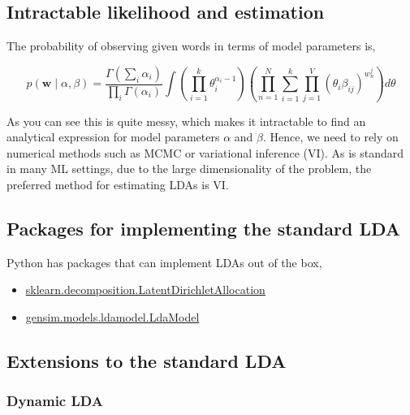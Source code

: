 \documentclass[
]{book}
\providecommand{\tightlist}{%
  \setlength{\itemsep}{0pt}\setlength{\parskip}{0pt}}
\begin{document}
\hypertarget{intractable-likelihood-and-estimation}{%
\subsection{Intractable likelihood and estimation}\label{intractable-likelihood-and-estimation}}

The probability of observing given words in terms of model parameters is,

\[p(\mathbf{w} \mid \alpha, \beta)=\frac{\Gamma\left(\sum_{i} \alpha_{i}\right)}{\prod_{i} \Gamma\left(\alpha_{i}\right)} \int\left(\prod_{i=1}^{k} \theta_{i}^{\alpha_{i}-1}\right)\left(\prod_{n=1}^{N} \sum_{i=1}^{k} \prod_{j=1}^{V}\left(\theta_{i} \beta_{i j}\right)^{w_{n}^{j}}\right) d \theta\]

As you can see this is quite messy, which makes it intractable to find an analytical expression for model parameters \(\alpha\) and \(\beta\). Hence, we need to rely on numerical methods such as MCMC or variational inference (VI). As is standard in many ML settings, due to the large dimensionality of the problem, the preferred method for estimating LDAs is VI.

\hypertarget{packages-for-implementing-the-standard-lda}{%
\subsection{Packages for implementing the standard LDA}\label{packages-for-implementing-the-standard-lda}}

Python has packages that can implement LDAs out of the box,

\begin{itemize}
\tightlist
\item
  \href{https://scikit-learn.org/stable/modules/generated/sklearn.decomposition.LatentDirichletAllocation.html}{sklearn.decomposition.LatentDirichletAllocation}
\item
  \href{https://radimrehurek.com/gensim/models/ldamodel.html}{gensim.models.ldamodel.LdaModel}
\end{itemize}

\hypertarget{extensions-to-the-standard-lda}{%
\subsection{Extensions to the standard LDA}\label{extensions-to-the-standard-lda}}

\hypertarget{dynamic-lda}{%
\subsubsection{Dynamic LDA}\label{dynamic-lda}}
\end{document}
